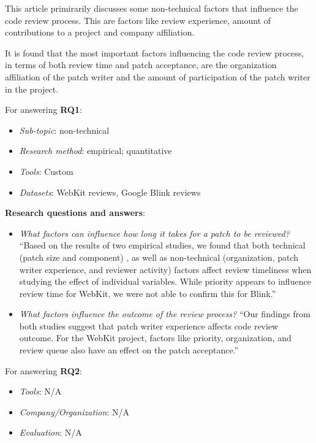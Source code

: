 \documentclass[]{book}
\providecommand{\tightlist}{%
  \setlength{\itemsep}{0pt}\setlength{\parskip}{0pt}}
\begin{document}
This article primirarily discusses some non-technical factors that
influence the code review process. This are factors like review
experience, amount of contributions to a project and company
affiliation.

It is found that the most important factors influencing the code review
process, in terms of both review time and patch acceptance, are the
organization affiliation of the patch writer and the amount of
participation of the patch writer in the project.

For answering \textbf{RQ1}:

\begin{itemize}
\tightlist
\item
  \emph{Sub-topic}: non-technical
\item
  \emph{Research method}: empirical; quantitative
\item
  \emph{Tools}: Custom
\item
  \emph{Datasets}: WebKit reviews, Google Blink reviews
\end{itemize}

\textbf{Research questions and answers}:

\begin{itemize}
\item
  \emph{What factors can influence how long it takes for a patch to be
  reviewed?} ``Based on the results of two empirical studies, we found
  that both technical (patch size and component) , as well as
  non-technical (organization, patch writer experience, and reviewer
  activity) factors affect review timeliness when studying the effect of
  individual variables. While priority appears to influence review time
  for WebKit, we were not able to confirm this for Blink.''
\item
  \emph{What factors influence the outcome of the review process?} ``Our
  findings from both studies suggest that patch writer experience
  affects code review outcome. For the WebKit project, factors like
  priority, organization, and review queue also have an effect on the
  patch acceptance.''
\end{itemize}

For answering \textbf{RQ2}:

\begin{itemize}
\tightlist
\item
  \emph{Tools}: N/A
\item
  \emph{Company/Organization}: N/A
\item
  \emph{Evaluation}: N/A
\end{itemize}
\end{document}
